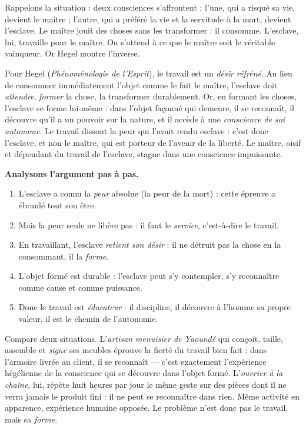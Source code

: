 \documentclass[11pt]{article}
\newcommand{\cle}[1]{{\popxbold\color{popdark}#1}}
\begin{document}
Rappelons la situation : deux consciences s'affrontent ; l'une, qui a risqué sa vie, devient le \cle{maître} ; l'autre, qui a préféré la vie et la servitude à la mort, devient l'\cle{esclave}. Le maître jouit des choses sans les transformer : il consomme. L'esclave, lui, travaille pour le maître. On s'attend à ce que le maître soit le véritable vainqueur. Or Hegel montre l'inverse.

\begin{propriete}
Pour Hegel (\emph{Phénoménologie de l'Esprit}), le travail est un \emph{désir réfréné}. Au lieu de consommer immédiatement l'objet comme le fait le maître, l'esclave doit \emph{attendre}, \emph{former} la chose, la transformer durablement. Or, en formant les choses, l'esclave se forme lui-même : dans l'objet façonné qui demeure, il se reconnaît, il découvre qu'il a un pouvoir sur la nature, et il accède à une \emph{conscience de soi autonome}. Le travail dissout la peur qui l'avait rendu esclave : c'est donc l'esclave, et non le maître, qui est porteur de l'avenir de la liberté. Le maître, oisif et dépendant du travail de l'esclave, stagne dans une conscience impuissante.
\end{propriete}

\textbf{Analysons l'argument pas à pas.}
\begin{enumerate}
\item L'esclave a connu la \emph{peur} absolue (la peur de la mort) : cette épreuve a ébranlé tout son être.
\item Mais la peur seule ne libère pas : il faut le \emph{service}, c'est-à-dire le travail.
\item En travaillant, l'esclave \emph{retient son désir} : il ne détruit pas la chose en la consommant, il la \emph{forme}.
\item L'objet formé est durable : l'esclave peut s'y contempler, s'y reconnaître comme cause et comme puissance.
\item Donc le travail est \emph{éducateur} : il discipline, il découvre à l'homme sa propre valeur, il est le chemin de l'autonomie.
\end{enumerate}

\begin{exemplebox}
Compare deux situations. L'\emph{artisan menuisier de Yaoundé} qui conçoit, taille, assemble et \emph{signe} ses meubles éprouve la fierté du travail bien fait : dans l'armoire livrée au client, il se reconnaît — c'est exactement l'expérience hégélienne de la conscience qui se découvre dans l'objet formé. L'\emph{ouvrier à la chaîne}, lui, répète huit heures par jour le même geste sur des pièces dont il ne verra jamais le produit fini : il ne peut se reconnaître dans rien. Même activité en apparence, expérience humaine opposée. Le problème n'est donc pas le travail, mais sa \emph{forme}.
\end{exemplebox}
\end{document}
